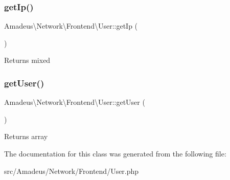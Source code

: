 \subsubsection{\texorpdfstring{get\+Ip()}{getIp()}}
{\footnotesize\ttfamily Amadeus\textbackslash{}\+Network\textbackslash{}\+Frontend\textbackslash{}\+User\+::get\+Ip (\begin{DoxyParamCaption}{ }\end{DoxyParamCaption})}

\begin{DoxyReturn}{Returns}
mixed 
\end{DoxyReturn}
\mbox{\label{classAmadeus_1_1Network_1_1Frontend_1_1User_acb0c975efed8a7c9cdd517fc2754c7f5}} 
\subsubsection{\texorpdfstring{get\+User()}{getUser()}}
{\footnotesize\ttfamily Amadeus\textbackslash{}\+Network\textbackslash{}\+Frontend\textbackslash{}\+User\+::get\+User (\begin{DoxyParamCaption}{ }\end{DoxyParamCaption})}

\begin{DoxyReturn}{Returns}
array 
\end{DoxyReturn}


The documentation for this class was generated from the following file\+:\begin{DoxyCompactItemize}
\item 
src/\+Amadeus/\+Network/\+Frontend/User.\+php\end{DoxyCompactItemize}
